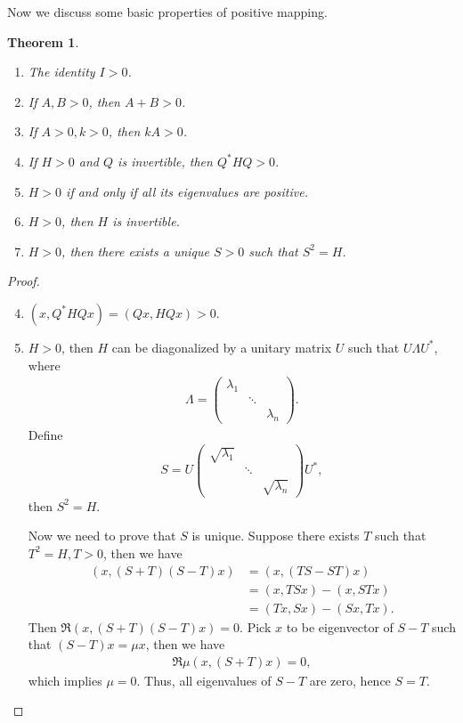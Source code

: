 \documentclass[10pt]{book}
\newtheorem{theorem}{Theorem}[chapter]
\theoremstyle{definition}
\numberwithin{equation}{chapter}
\begin{document}
\medskip

Now we discuss some basic properties of positive mapping. 

\medskip

\begin{theorem}\label{unique_square_root}
~\begin{enumerate}[label=(\alph*)]
    \item The identity $I > 0$.
    \item If $A, B > 0$, then $A + B > 0$.
    \item If $A > 0, k > 0$, then $k A > 0$.
    \item If $H > 0$ and $Q$ is invertible, then $Q^* H Q > 0$.
    \item $H > 0$ if and only if all its eigenvalues are positive.
    \item $H > 0$, then $H$ is invertible.
    \item $H > 0$, then there exists a unique $S > 0$ such that $S^2 = H$.
\end{enumerate}
\end{theorem}
\begin{proof}
~\begin{enumerate}[label=(\alph*)]
    \setcounter{enumi}{3}
    \item $(x, Q^* H Q x) = (Qx, HQx) > 0$.
    \setcounter{enumi}{6}
    \item $H > 0$, then $H$ can be diagonalized by a unitary matrix $U$ such that $U\Lambda U^*$, where 
    \begin{align*}
        \Lambda = \begin{pmatrix}
            \lambda_1 &  &  \\
            & \ddots &  \\
            &  & \lambda_n
        \end{pmatrix}.
    \end{align*}
    Define $$S = U \begin{pmatrix}
        \sqrt{\lambda_1} &  &  \\
        & \ddots &  \\
        &  & \sqrt{\lambda_n}
    \end{pmatrix} U^*,$$ 
    then $S^2  = H$. 
        
    Now we need to prove that $S$ is unique. Suppose there exists $T$ such that $T^2 = H, T > 0$, then we have
    \begin{align*}
        (x, (S+T)(S-T)x) & = (x, (TS - ST)x) \\
        & = (x, TS x) - (x, STx) \\
        & = (Tx, Sx) - (Sx, Tx).
    \end{align*}
    Then $\Re (x, (S+T)(S-T)x) = 0$. Pick $x$ to be eigenvector of $S-T$ such that $(S-T)x = \mu x$, then we have 
    \begin{align*}
        \Re \mu (x, (S+T)x) = 0,
    \end{align*}
    which implies $\mu = 0$. Thus, all eigenvalues of $S-T$ are zero, hence $S = T$.
\end{enumerate}
\end{proof}
\end{document}
